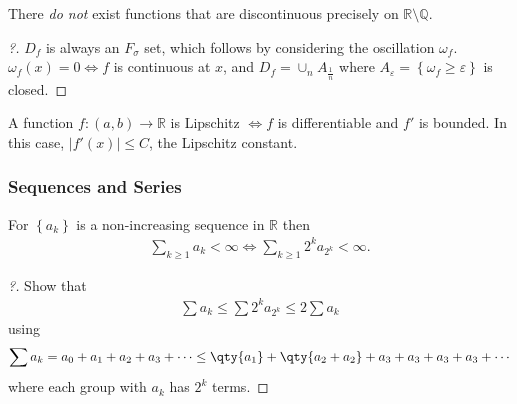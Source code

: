\begin{proposition}

There \emph{do not} exist functions that are discontinuous precisely on
\({\mathbb{R}}\setminus {\mathbb{Q}}\).

\end{proposition}

\begin{proof}[?]

\(D_f\) is always an \(F_\sigma\) set, which follows by considering the
oscillation \(\omega_f\). \(\omega_f(x) = 0 \iff f\) is continuous at
\(x\), and \(D_f = \cup_n A_{\frac 1 n}\) where
\(A_\varepsilon = \left\{{\omega_f \geq \varepsilon}\right\}\) is
closed.

\end{proof}

\begin{proposition}

A function \(f: (a, b) \to {\mathbb{R}}\) is Lipschitz \(\iff f\) is
differentiable and \(f'\) is bounded. In this case,
\({\left\lvert {f'(x)} \right\rvert} \leq C\), the Lipschitz constant.

\end{proposition}

\hypertarget{sequences-and-series}{%
\subsubsection{Sequences and Series}\label{sequences-and-series}}

\begin{proposition}

For \(\left\{{a_k}\right\}\) is a non-increasing sequence in
\({\mathbb{R}}\) then
\begin{align*}
\sum_{k\geq 1} a_k < \infty \iff \sum_{k\geq 1} 2^k a_{2^k}<\infty
.\end{align*}

\end{proposition}

\begin{proof}[?]

Show that
\begin{align*}
\sum a_k \leq \sum 2^k a_{2^k} \leq 2 \sum a_k
\end{align*}
using
\begin{align*}
\sum a_k = a_0 + a_1 + a_2 + a_3 + \cdots
\leq \qty{a_1} + \qty{a_2 + a_2} + {a_3 + a_3 + a_3 + a_3} + \cdots \\
\end{align*}
where each group with \(a_k\) has \(2^k\) terms.

\end{proof}

